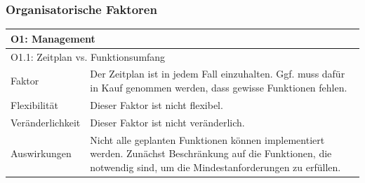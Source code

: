 \documentclass[fontsize=12pt,paper=a4,twoside]{scrartcl}
\begin{document}
\subsubsection{Organisatorische Faktoren}
\begin{tabularx}{\textwidth}{|l|X|}
\hline
\multicolumn{2}{|l|}{\textbf{O1: Management}}\\\hline
\multicolumn{2}{|l|}{O1.1: Zeitplan vs. Funktionsumfang}\\\hline
 Faktor & Der Zeitplan ist in jedem Fall einzuhalten. Ggf. muss dafür in Kauf genommen werden, dass gewisse Funktionen fehlen. \\\hline
 Flexibilität & Dieser Faktor ist nicht flexibel.\\\hline
 Veränderlichkeit & Dieser Faktor ist nicht veränderlich.\\\hline
 Auswirkungen & Nicht alle geplanten Funktionen können implementiert werden. Zunächst Beschränkung auf die Funktionen, die notwendig sind, um die Mindestanforderungen zu erfüllen.\\\hline
\end{tabularx}

\newpage
\end{document}
